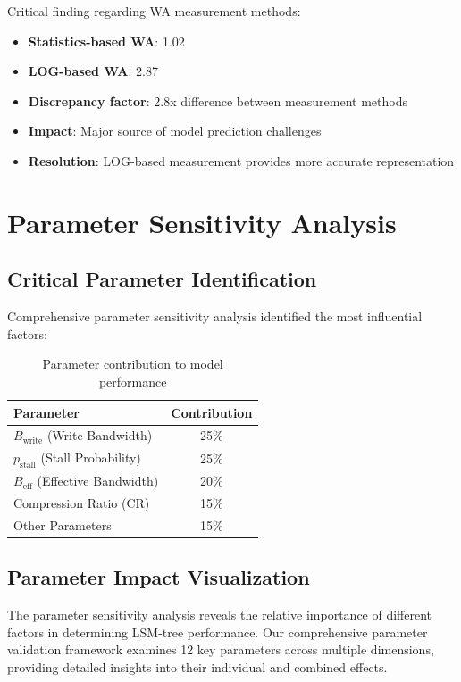 \documentclass[11pt]{article}
\newcommand{\pstall}{p_{\text{stall}}}
\begin{document}
Critical finding regarding WA measurement methods:
\begin{itemize}
    \item \textbf{Statistics-based WA}: 1.02
    \item \textbf{LOG-based WA}: 2.87
    \item \textbf{Discrepancy factor}: 2.8x difference between measurement methods
    \item \textbf{Impact}: Major source of model prediction challenges
    \item \textbf{Resolution}: LOG-based measurement provides more accurate representation
\end{itemize}

\section{Parameter Sensitivity Analysis}

\subsection{Critical Parameter Identification}

Comprehensive parameter sensitivity analysis identified the most influential factors:

\begin{table}[H]
\centering
\begin{tabular}{@{}lc@{}}
\toprule
\textbf{Parameter} & \textbf{Contribution} \\
\midrule
$B_{\text{write}}$ (Write Bandwidth) & 25\% \\
$\pstall$ (Stall Probability) & 25\% \\
$B_{\text{eff}}$ (Effective Bandwidth) & 20\% \\
Compression Ratio (CR) & 15\% \\
Other Parameters & 15\% \\
\bottomrule
\end{tabular}
\caption{Parameter contribution to model performance}
\label{tab:parameter_contribution}
\end{table}

\subsection{Parameter Impact Visualization}

The parameter sensitivity analysis reveals the relative importance of different factors in determining LSM-tree performance. Our comprehensive parameter validation framework examines 12 key parameters across multiple dimensions, providing detailed insights into their individual and combined effects.
\end{document}
